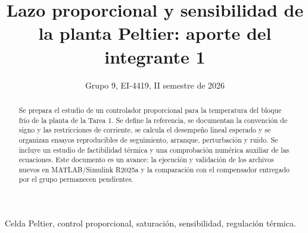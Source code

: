 \documentclass[journal,twocolumn]{IEEEtran}
\begin{document}
\title{Lazo proporcional y sensibilidad de la planta Peltier: aporte del integrante 1}
\author{Grupo 9, EI-4419, II semestre de 2026}
\maketitle
\begin{abstract}
Se prepara el estudio de un controlador proporcional para la temperatura del bloque frío de la planta de la Tarea 1. Se define la referencia, se documentan la convención de signo y las restricciones de corriente, se calcula el desempeño lineal esperado y se organizan ensayos reproducibles de seguimiento, arranque, perturbación y ruido. Se incluye un estudio de factibilidad térmica y una comprobación numérica auxiliar de las ecuaciones. Este documento es un avance: la ejecución y validación de los archivos nuevos en MATLAB/Simulink R2025a y la comparación con el compensador entregado por el grupo permanecen pendientes.
\end{abstract}
\begin{IEEEkeywords}Celda Peltier, control proporcional, saturación, sensibilidad, regulación térmica.\end{IEEEkeywords}

\end{document}
